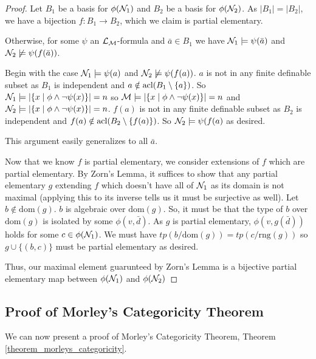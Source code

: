 \begin{proof}
Let \(B_1\) be a basis for \(\phi(\mathcal{N}_1)\) and \(B_2\) be a basis for \(\phi(\mathcal{N}_2)\).
As \(|B_1| = |B_2|\), we have a bijection \(f: B_1 \to B_2\), which we claim is partial elementary. 

Otherwise, for some \(\psi\) an \(\mathcal{L}_{\mathcal{M}}\)-formula and \(\bar{a} \in B_1\) we have \(\mathcal{N}_1 \models \psi(\bar{a})\) and \(\mathcal{N}_2 \not\models \psi(f(\bar{a}))\). 

Begin with the case \(\mathcal{N}_1 \models \psi(a)\) and \(\mathcal{N}_2 \not \models \psi(f(a))\). 
\(a\) is not in any finite definable subset as \(B_1\) is independent and \(a \notin \text{acl}(B_1 \setminus\{a\})\). 
So \(\mathcal{N}_1 \models |\{x \mid \phi \land \neg \psi(x)\}| = n\) so \(\mathcal{M} \models |\{x \mid \phi \land \neg \psi(x)\}| = n\)
and \(\mathcal{N}_2 \models |\{x \mid \phi \land \neg \psi(x)\}| = n\).
\(f(a)\) is not in any finite definable subset as \(B_2\) is independent and \(f(a) \notin \text{acl}(B_2 \setminus\{f(a)\})\). 
So \(\mathcal{N}_2 \models \psi(f(a)\) as desired. 

This argument easily generalizes to all \(\bar{a}\). 

Now that we know \(f\) is partial elementary, we consider extensions of \(f\) which are partial elementary. 
By Zorn's Lemma, it suffices to show that any partial elementary \(g\) extending \(f\) which doesn't have all of \(\mathcal{N}_1\) as its domain is not maximal (applying this to its inverse tells us it must be surjective as well).
Let \(b \notin \text{dom}(g)\). \(b\) is algebraic over \(\text{dom}(g)\). %
So, it must be that the type of \(b\) over \(\text{dom}(g)\) is isolated by some \(\phi(v, \bar{d})\).
As \(g\) is partial elementary, \(\phi(v, g(\bar{d}))\) holds for some \(c \in \phi(\mathcal{N}_1)\).  %
We must have \(tp(b/\text{dom}(g)) = tp (c/\text{rng}(g))\) so \(g \cup \{(b, c)\}\) must be partial elementary as desired. 

Thus, our maximal element guarunteed by Zorn's Lemma is a bijective partial elementary map between \(\phi(\mathcal{N}_1)\) and  \(\phi(\mathcal{N}_2)\)
\end{proof}

\subsection{Proof of Morley's Categoricity Theorem}

We can now present a proof of Morley's Categoricity Theorem, Theorem \ref{theorem_morleys_categoricity}.

